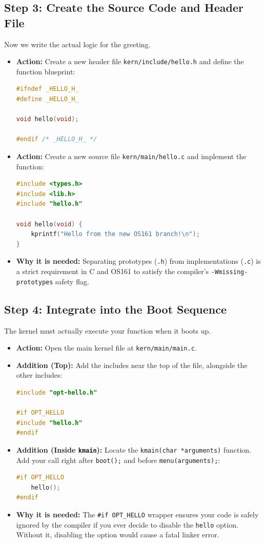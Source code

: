 \subsection{Step 3: Create the Source Code and Header File}
Now we write the actual logic for the greeting.
\begin{itemize}
    \item \textbf{Action:} Create a new header file \texttt{kern/include/hello.h} and define the function blueprint:
\begin{lstlisting}[language=C]
#ifndef _HELLO_H_
#define _HELLO_H_

void hello(void);

#endif /* _HELLO_H_ */
\end{lstlisting}
    \item \textbf{Action:} Create a new source file \texttt{kern/main/hello.c} and implement the function:
\begin{lstlisting}[language=C]
#include <types.h>
#include <lib.h>
#include "hello.h"

void hello(void) {
    kprintf("Hello from the new OS161 branch!\n");
}
\end{lstlisting}
    \item \textbf{Why it is needed:} Separating prototypes (\texttt{.h}) from implementations (\texttt{.c}) is a strict requirement in C and OS161 to satisfy the compiler's \texttt{-Wmissing-prototypes} safety flag.
\end{itemize}

\subsection{Step 4: Integrate into the Boot Sequence}
The kernel must actually execute your function when it boots up.
\begin{itemize}
    \item \textbf{Action:} Open the main kernel file at \texttt{kern/main/main.c}.
    \item \textbf{Addition (Top):} Add the includes near the top of the file, alongside the other includes:
\begin{lstlisting}[language=C]
#include "opt-hello.h"

#if OPT_HELLO
#include "hello.h"
#endif
\end{lstlisting}
    \item \textbf{Addition (Inside \texttt{kmain}):} Locate the \texttt{kmain(char *arguments)} function. Add your call right after \texttt{boot();} and before \texttt{menu(arguments);}:
\begin{lstlisting}[language=C]
#if OPT_HELLO
    hello();
#endif
\end{lstlisting}
    \item \textbf{Why it is needed:} The \texttt{\#if OPT\_HELLO} wrapper ensures your code is safely ignored by the compiler if you ever decide to disable the \texttt{hello} option. Without it, disabling the option would cause a fatal linker error.
\end{itemize}

